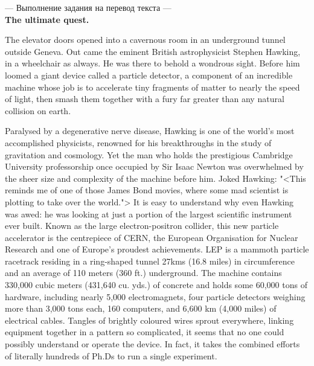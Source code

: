 \documentclass[main.tex]{subfiles}
\begin{document}


--- Выполнение задания на перевод текста ---
\\

\textbf{The ultimate quest.}

The elevator doors opened into a cavernous room in an underground tunnel outside Geneva.
Out came the eminent British astrophysicist Stephen Hawking, in a wheelchair as always.
He was there to behold a wondrous sight.
Before him loomed a giant device called a particle detector, a component of an incredible machine whose job is to accelerate tiny fragments of matter to nearly the speed of light, then smash them together with a fury far greater than any natural collision on earth.

Paralysed by a degenerative nerve disease, Hawking is one of the world's most accomplished physicists, renowned for his breakthroughs in the study of gravitation and cosmology.
Yet the man who holds the prestigious Cambridge University professorship once occupied by Sir Isaac Newton was overwhelmed by the sheer size and complexity of the machine before him.
Joked Hawking: "<This reminds me of one of those James Bond movies, where some mad scientist is plotting to take over the world.">
It is easy to understand why even Hawking was awed: he was looking at just a portion of the largest scientific instrument ever built.
Known as the large electron-positron collider, this new particle accelerator is the centrepiece of CERN, the European Organisation for Nuclear Research and one of Europe's proudest achievements.
LEP is a mammoth particle racetrack residing in a ring-shaped tunnel 27kms (16.8 miles) in circumference and an average of 110 meters (360 ft.) underground.
The machine contains 330,000 cubic meters (431,640 cu. yds.) of concrete and holds some 60,000 tons of hardware, including nearly 5,000 electromagnets, four particle detectors weighing more than 3,000 tons each, 160 computers, and 6,600 km (4,000 miles) of electrical cables.
Tangles of brightly coloured wires sprout everywhere, linking equipment together in a pattern so complicated, it seems that no one could possibly understand or operate the device.
In fact, it takes the combined efforts of literally hundreds of Ph.Ds to run a single experiment.
\\

\end{document}
